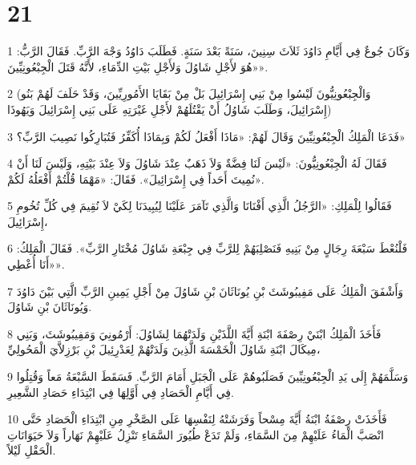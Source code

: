 \chapter{21}

\par 1 وَكَانَ جُوعٌ فِي أَيَّامِ دَاوُدَ ثَلاَثَ سِنِينَ، سَنَةً بَعْدَ سَنَةٍ. فَطَلَبَ دَاوُدُ وَجْهَ الرَّبِّ. فَقَالَ الرَّبُّ: «هُوَ لأَجْلِ شَاوُلَ وَلأَجْلِ بَيْتِ الدِّمَاءِ، لأَنَّهُ قَتَلَ الْجِبْعُونِيِّينَ».
\par 2 (وَالْجِبْعُونِيُّونَ لَيْسُوا مِنْ بَنِي إِسْرَائِيلَ بَلْ مِنْ بَقَايَا الأَمُورِيِّينَ، وَقَدْ حَلَفَ لَهُمْ بَنُو إِسْرَائِيلَ، وَطَلَبَ شَاوُلُ أَنْ يَقْتُلَهُمْ لأَجْلِ غَيْرَتِهِ عَلَى بَنِي إِسْرَائِيلَ وَيَهُوذَا)
\par 3 فَدَعَا الْمَلِكُ الْجِبْعُونِيِّينَ وَقَالَ لَهُمْ: «مَاذَا أَفْعَلُ لَكُمْ وَبِمَاذَا أُكَفِّرُ فَتُبَارِكُوا نَصِيبَ الرَّبِّ؟»
\par 4 فَقَالَ لَهُ الْجِبْعُونِيُّونَ: «لَيْسَ لَنَا فِضَّةٌ وَلاَ ذَهَبٌ عِنْدَ شَاوُلَ وَلاَ عِنْدَ بَيْتِهِ، وَلَيْسَ لَنَا أَنْ نُمِيتَ أَحَداً فِي إِسْرَائِيلَ». فَقَالَ: «مَهْمَا قُلْتُمْ أَفْعَلُهُ لَكُمْ».
\par 5 فَقَالُوا لِلْمَلِكِ: «الرَّجُلُ الَّذِي أَفْنَانَا وَالَّذِي تَآمَرَ عَلَيْنَا لِيُبِيدَنَا لِكَيْ لاَ نُقِيمَ فِي كُلِّ تُخُومِ إِسْرَائِيلَ،
\par 6 فَلْنُعْطَ سَبْعَةَ رِجَالٍ مِنْ بَنِيهِ فَنَصْلِبَهُمْ لِلرَّبِّ فِي جِبْعَةِ شَاوُلَ مُخْتَارِ الرَّبِّ». فَقَالَ الْمَلِكُ: «أَنَا أُعْطِي».
\par 7 وَأَشْفَقَ الْمَلِكُ عَلَى مَفِيبُوشَثَ بْنِ يُونَاثَانَ بْنِ شَاوُلَ مِنْ أَجْلِ يَمِينِ الرَّبِّ الَّتِي بَيْنَ دَاوُدَ وَيُونَاثَانَ بْنِ شَاوُلَ.
\par 8 فَأَخَذَ الْمَلِكُ ابْنَيْ رِصْفَةَ ابْنَةِ أَيَّةَ اللَّذَيْنِ وَلَدَتْهُمَا لِشَاوُلَ: أَرْمُونِيَ وَمَفِيبُوشَثَ، وَبَنِي مِيكَالَ ابْنَةِ شَاوُلَ الْخَمْسَةَ الَّذِينَ وَلَدَتْهُمْ لِعَدْرِئِيلَ بْنِ بَرْزِلاَّيَ الْمَحُولِيِّ،
\par 9 وَسَلَّمَهُمْ إِلَى يَدِ الْجِبْعُونِيِّينَ فَصَلَبُوهُمْ عَلَى الْجَبَلِ أَمَامَ الرَّبِّ. فَسَقَطَ السَّبْعَةُ مَعاً وَقُتِلُوا فِي أَيَّامِ الْحَصَادِ فِي أَوَّلِهَا فِي ابْتِدَاءِ حَصَادِ الشَّعِيرِ.
\par 10 فَأَخَذَتْ رِصْفَةُ ابْنَةُ أَيَّةَ مِسْحاً وَفَرَشَتْهُ لِنَفْسِهَا عَلَى الصَّخْرِ مِنِ ابْتِدَاءِ الْحَصَادِ حَتَّى انْصَبَّ الْمَاءُ عَلَيْهِمْ مِنَ السَّمَاءِ، وَلَمْ تَدَعْ طُيُورَ السَّمَاءِ تَنْزِلُ عَلَيْهِمْ نَهَاراً وَلاَ حَيَوَانَاتِ الْحَقْلِ لَيْلاً.
